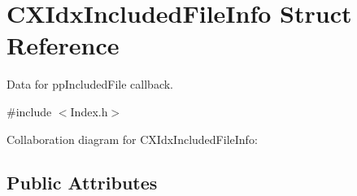 \hypertarget{structCXIdxIncludedFileInfo}{}\section{C\+X\+Idx\+Included\+File\+Info Struct Reference}
\label{structCXIdxIncludedFileInfo}


Data for pp\+Included\+File callback.  




{\ttfamily \#include $<$Index.\+h$>$}



Collaboration diagram for C\+X\+Idx\+Included\+File\+Info\+:
\subsection*{Public Attributes}
